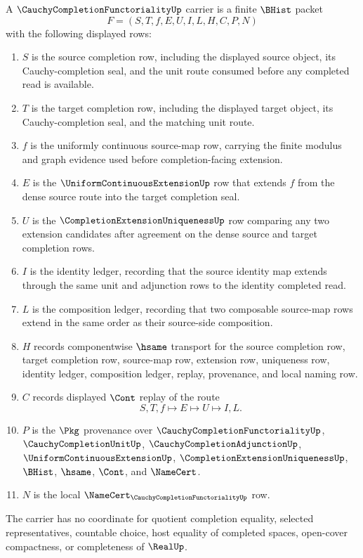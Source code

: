 \begin{definition}
\label{def:cauchy-completion-functoriality-carrier}
A $\CauchyCompletionFunctorialityUp$ carrier is a finite $\BHist$ packet
$$
F=(S,T,f,E,U,I,L,H,C,P,N)
$$
with the following displayed rows:
\begin{enumerate}
\item $S$ is the source completion row, including the displayed source object, its Cauchy-completion seal, and the unit route consumed before any completed read is available.
\item $T$ is the target completion row, including the displayed target object, its Cauchy-completion seal, and the matching unit route.
\item $f$ is the uniformly continuous source-map row, carrying the finite modulus and graph evidence used before completion-facing extension.
\item $E$ is the $\UniformContinuousExtensionUp$ row that extends $f$ from the dense source route into the target completion seal.
\item $U$ is the $\CompletionExtensionUniquenessUp$ row comparing any two extension candidates after agreement on the dense source and target completion rows.
\item $I$ is the identity ledger, recording that the source identity map extends through the same unit and adjunction rows to the identity completed read.
\item $L$ is the composition ledger, recording that two composable source-map rows extend in the same order as their source-side composition.
\item $H$ records componentwise $\hsame$ transport for the source completion row, target completion row, source-map row, extension row, uniqueness row, identity ledger, composition ledger, replay, provenance, and local naming row.
\item $C$ records displayed $\Cont$ replay of the route
$$
S,T,f\longmapsto E\longmapsto U\longmapsto I,L .
$$
\item $P$ is the $\Pkg$ provenance over $\CauchyCompletionFunctorialityUp$, $\CauchyCompletionUnitUp$, $\CauchyCompletionAdjunctionUp$, $\UniformContinuousExtensionUp$, $\CompletionExtensionUniquenessUp$, $\BHist$, $\hsame$, $\Cont$, and $\NameCert$.
\item $N$ is the local $\NameCert_{\CauchyCompletionFunctorialityUp}$ row.
\end{enumerate}
The carrier has no coordinate for quotient completion equality, selected representatives, countable choice, host equality of completed spaces, open-cover compactness, or completeness of $\RealUp$.
\end{definition}

